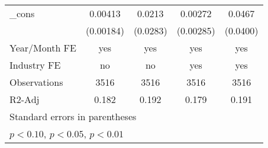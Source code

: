 \begin{table}[htbp]
\begin{tabular}{l*{4}{c}}
\_cons          &  0.00413\sym{**} &   0.0213         &  0.00272         &   0.0467         \\
                &(0.00184)         & (0.0283)         &(0.00285)         & (0.0400)         \\
\hline
Year/Month FE   &      yes         &      yes         &      yes         &      yes         \\
Industry FE     &       no         &       no         &      yes         &      yes         \\
Observations    &     3516         &     3516         &     3516         &     3516         \\
R2-Adj          &    0.182         &    0.192         &    0.179         &    0.191         \\
\hline\hline
\multicolumn{5}{l}{\footnotesize Standard errors in parentheses}\\
\multicolumn{5}{l}{\footnotesize \sym{*} \(p<0.10\), \sym{**} \(p<0.05\), \sym{***} \(p<0.01\)}\\
\end{tabular}
\end{table}
